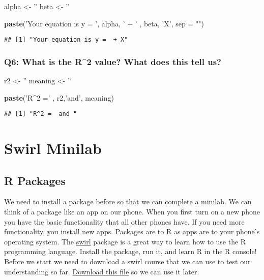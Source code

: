 \documentclass[]{book}
\newenvironment{Shaded}{\begin{snugshade}}{\end{snugshade}}
\newcommand{\KeywordTok}[1]{\textcolor[rgb]{0.13,0.29,0.53}{\textbf{#1}}}
\newcommand{\DataTypeTok}[1]{\textcolor[rgb]{0.13,0.29,0.53}{#1}}
\newcommand{\StringTok}[1]{\textcolor[rgb]{0.31,0.60,0.02}{#1}}
\newcommand{\NormalTok}[1]{#1}
\begin{document}
\begin{Shaded}
\begin{Highlighting}[]
\NormalTok{alpha <-}\StringTok{ ''}
\NormalTok{beta <-}\StringTok{ ''}

\KeywordTok{paste}\NormalTok{(}\StringTok{'Your equation is y = '}\NormalTok{, alpha, }\StringTok{' + '}\NormalTok{ , beta, }\StringTok{'X'}\NormalTok{, }\DataTypeTok{sep =} \StringTok{""}\NormalTok{)}
\end{Highlighting}
\end{Shaded}

\begin{verbatim}
## [1] "Your equation is y =  + X"
\end{verbatim}

\subsection{Q6: What is the R\^{}2 value? What does this tell
us?}\label{q6-what-is-the-r2-value-what-does-this-tell-us}

\begin{Shaded}
\begin{Highlighting}[]
\NormalTok{r2 <-}\StringTok{ ''}
\NormalTok{meaning <-}\StringTok{ ''}

\KeywordTok{paste}\NormalTok{(}\StringTok{'R^2 ='}\NormalTok{ , r2,}\StringTok{'and'}\NormalTok{, meaning)}
\end{Highlighting}
\end{Shaded}

\begin{verbatim}
## [1] "R^2 =  and "
\end{verbatim}

\chapter{Swirl Minilab}\label{swirllab}

\section{R Packages}\label{r-packages}

We need to install a package before so that we can complete a minilab.
We can think of a package like an app on our phone. When you first turn
on a new phone you have the basic functionality that all other phones
have. If you need more functionality, you install new apps. Packages are
to R as apps are to your phone's operating system. The
\href{https://swirlstats.com/students.html}{swirl} package is a great
way to learn how to use the R programming language. Install the package,
run it, and learn R in the R console! Before we start we need to
download a swirl course that we can use to test our understanding so
far.
\href{https://github.com/scottyla19/as-r-intro/blob/master/AS_Intro_to_R.swc?raw=true}{Download
this file} so we can use it later.
\end{document}
